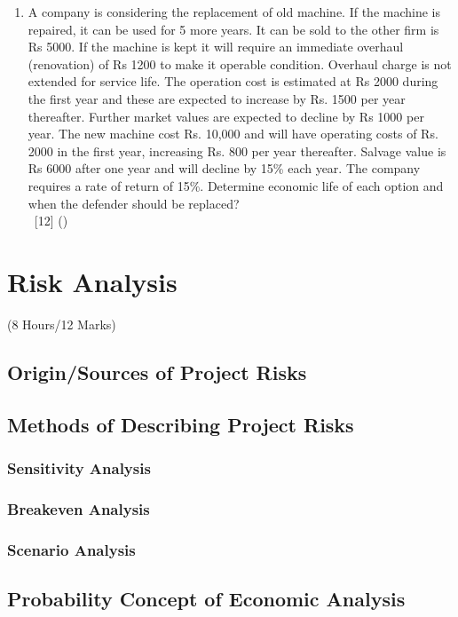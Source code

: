 \documentclass[12pt]{article}
\newcommand{\enter}{\\\textcolor{white}{1}}
\begin{document}
\begin{enumerate}
				\item A company is considering the replacement of old machine. If the machine is repaired, it can be used for 5 more years. It can be sold to the other firm is Rs 5000. If the machine is kept it will require an immediate overhaul (renovation) of Rs 1200 to make it operable condition. Overhaul charge is not extended for service life. The operation cost is estimated at Rs 2000 during the first year and these are expected to increase by Rs. 1500 per year thereafter. Further market values are expected to decline by Rs 1000 per year. The new machine cost Rs. 10,000 and will have operating costs of Rs. 2000 in the first year, increasing Rs. 800 per year thereafter. Salvage value is Rs 6000 after one year and will decline by 15\% each year. The company requires a rate of return of 15\%. Determine economic life of each option and when the defender should be replaced?
				\enter\hfill [12] ()
			\end{enumerate}

	\pagebreak
\section{Risk Analysis}
	\begin{center}(8 Hours/12 Marks)\end{center}
	\subsection{Origin/Sources of Project Risks}
	\subsection{Methods of Describing Project Risks}
	\subsubsection{Sensitivity Analysis}
	\subsubsection{Breakeven Analysis}
	\subsubsection{Scenario Analysis}
	\subsection{Probability Concept of Economic Analysis}
\end{document}
